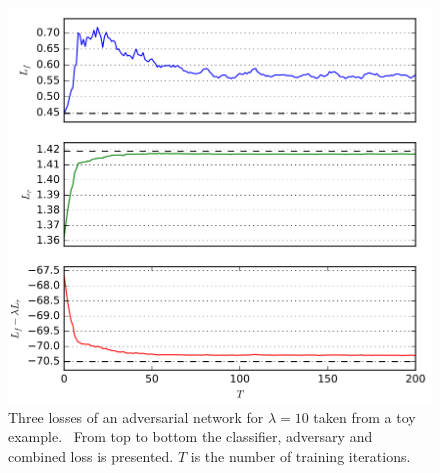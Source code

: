 \begin{figure}[htbp]
	\centering
	\includegraphics[width=\textwidth]{figures_ML/losses_paper}
	\caption[Exemplary loss of an adversarial network structure]{Three losses of an adversarial network for $\lambda = 10$ taken from a toy example.~\cite{Louppe:2016ylz} From top to bottom the classifier, adversary and combined loss is presented. $T$ is the number of training iterations.}
	\label{fig:losses_paper}
\end{figure}



